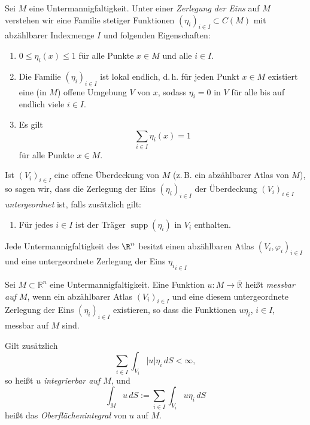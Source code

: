 \documentclass[11pt, a4paper]{article}
\begin{document}
\begin{definition}
Sei $M$ eine Untermannigfaltigkeit. Unter einer \emph{Zerlegung der Eins} auf $M$ verstehen wir eine Familie stetiger Funktionen $(\eta_i)_{i \in I} \subset C(M)$ mit abzählbarer Indexmenge $I$ und folgenden Eigenschaften:

\begin{enumerate}
    \item[(i)] $0 \le \eta_i(x) \le 1$ für alle Punkte $x \in M$ und alle $i \in I$.
    
    \item[(ii)] Die Familie $(\eta_i)_{i \in I}$ ist lokal endlich, d.\,h. für jeden Punkt $x \in M$ existiert eine (in $M$) offene Umgebung $V$ von $x$, sodass $\eta_i = 0$ in $V$ für alle bis auf endlich viele $i \in I$.
    
    \item[(iii)] Es gilt 
    \[
        \sum_{i \in I} \eta_i(x) = 1
    \]
    für alle Punkte $x \in M$.
\end{enumerate}

Ist $(V_i)_{i \in I}$ eine offene Überdeckung von $M$ (z.\,B. ein abzählbarer Atlas von $M$), so sagen wir, dass die Zerlegung der Eins $(\eta_i)_{i \in I}$ der Überdeckung $(V_i)_{i \in I}$ \emph{untergeordnet} ist, falls zusätzlich gilt:

\begin{enumerate}
    \item[(iv)] Für jedes $i \in I$ ist der Träger $\operatorname{supp}(\eta_i)$ in $V_i$ enthalten.
\end{enumerate}
\end{definition}

\begin{theorem} Jede Untermannigfaltigkeit des $\R^n$ besitzt einen
abzählbaren Atlas $(V_i,\varphi_i)_{i\in I}$ und eine untergeordnete Zerlegung der Eins ${\eta _i }_{i\in I}$
\end{theorem}

\begin{definition}
Sei $M \subset \mathbb{R}^n$ eine Untermannigfaltigkeit. Eine Funktion 
$u : M \to \overline{\mathbb{R}}$ heißt \emph{messbar auf $M$}, wenn ein abzählbarer Atlas 
$(V_i)_{i \in I}$ und eine diesem untergeordnete Zerlegung der Eins 
$(\eta_i)_{i \in I}$ existieren, so dass die Funktionen $u \eta_i$, $i \in I$, 
messbar auf $M$ sind.

Gilt zusätzlich
\[
\sum_{i \in I} \int_{V_i} |u| \eta_i \, dS < \infty,
\]
so heißt $u$ \emph{integrierbar auf $M$}, und
\[
\int_M u \, dS 
:= 
\sum_{i \in I} \int_{V_i} u \eta_i \, dS
\]
heißt das \emph{Oberflächenintegral} von $u$ auf $M$.
\end{definition}
    
\end{document}

